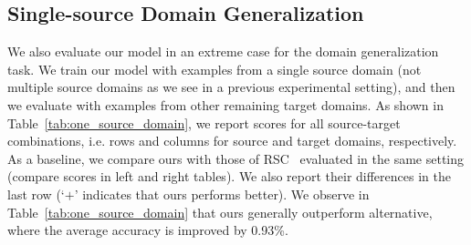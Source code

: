\documentclass[10pt,twocolumn,letterpaper]{article}
\begin{document}
\subsection{Single-source Domain Generalization}\label{sec:one_source}
We also evaluate our model in an extreme case for the domain generalization task. We train our model with examples from a single source domain (not multiple source domains as we see in a previous experimental setting), and then we evaluate with examples from other remaining target domains. As shown in Table~\ref{tab:one_source_domain}, we report scores for all source-target combinations, i.e. rows and columns for source and target domains, respectively. As a baseline, we compare ours with those of RSC~\cite{huangRSC2020} evaluated in the same setting (compare scores in left and right tables). We also report their differences in the last row (`$+$' indicates that ours performs better). We observe in Table~\ref{tab:one_source_domain} that ours generally outperform alternative, where the average accuracy is improved by 0.93\%.
\end{document}
